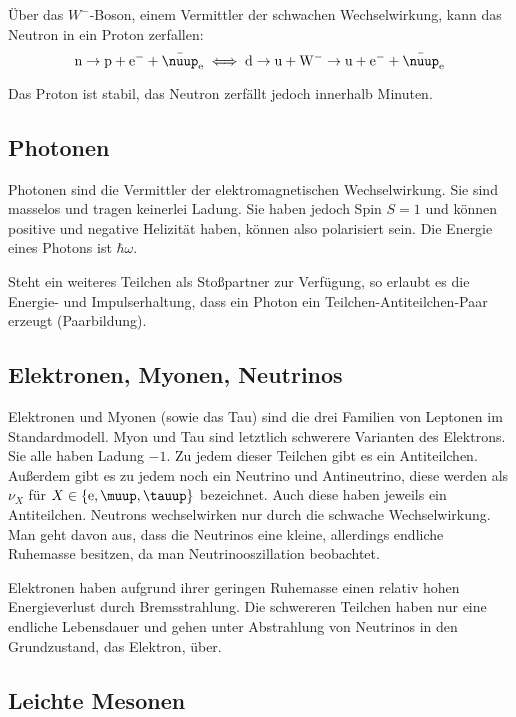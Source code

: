 \documentclass[11pt, ngerman, fleqn, DIV=15, headinclude, BCOR=2cm]{scrreprt}
\begin{document}
Über das $W^-$-Boson, einem Vermittler der schwachen Wechselwirkung, kann das
Neutron in ein Proton zerfallen:
\[
    \mathrm n \to \mathrm p + \mathrm e^- + \bar
    \nuup_\mathrm e
    \iff
    \mathrm d
    \to
    \mathrm u + \mathrm W^-
    \to
    \mathrm u
    + \mathrm e^- + \bar \nuup_\mathrm e
\]

Das Proton ist stabil, das Neutron zerfällt jedoch innerhalb Minuten.

\subsection{Photonen}

Photonen sind die Vermittler der elektromagnetischen Wechselwirkung. Sie sind
masselos und tragen keinerlei Ladung. Sie haben jedoch Spin $S = 1$ und können
positive und negative Helizität haben, können also polarisiert sein. Die
Energie eines Photons ist $\hbar \omega$.

Steht ein weiteres Teilchen als Stoßpartner zur Verfügung, so erlaubt es die
Energie- und Impulserhaltung, dass ein Photon ein Teilchen-Antiteilchen-Paar
erzeugt (Paarbildung).

\subsection{Elektronen, Myonen, Neutrinos}

Elektronen und Myonen (sowie das Tau) sind die drei Familien von Leptonen im
Standardmodell. Myon und Tau sind letztlich schwerere Varianten des Elektrons.
Sie alle haben Ladung $-1$. Zu jedem dieser Teilchen gibt es ein Antiteilchen.
Außerdem gibt es zu jedem noch ein Neutrino und Antineutrino, diese werden als
$\nu_X$ für $X \in \{ \eup, \muup, \tauup \}$ bezeichnet. Auch diese haben
jeweils ein Antiteilchen. Neutrons wechselwirken nur durch die schwache
Wechselwirkung. Man geht davon aus, dass die Neutrinos eine kleine, allerdings
endliche Ruhemasse besitzen, da man Neutrinooszillation beobachtet.

Elektronen haben aufgrund ihrer geringen Ruhemasse einen relativ hohen
Energieverlust durch Bremsstrahlung. Die schwereren Teilchen haben nur eine
endliche Lebensdauer und gehen unter Abstrahlung von Neutrinos in den
Grundzustand, das Elektron, über.

\subsection{Leichte Mesonen}
\label{sec:leichte_mesonen}
\end{document}
